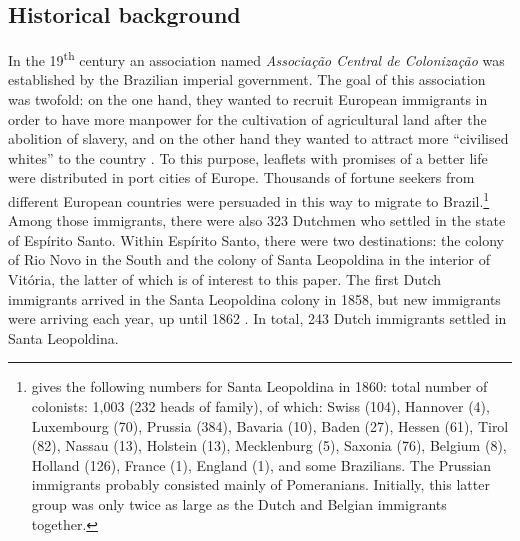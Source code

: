 \documentclass[output=paper,hidelinks,draftmode]{langscibook}
\begin{document}
\subsection{Historical background}

In the 19\textsuperscript{th} century an association named \textit{Associação Central de Colonização} was established by the Brazilian imperial government. The goal of this association was twofold: on the one hand, they wanted to recruit European immigrants in order to have more manpower for the cultivation of agricultural land after the abolition of slavery, and on the other hand they wanted to attract more ``civilised whites'' to the country \citep[11]{RoosEshuis2008}. To this purpose, leaflets with promises of a better life were distributed in port cities of Europe. Thousands of fortune seekers from different European countries were persuaded in this way to migrate to Brazil.\footnote{\citet{Tschudi2004} gives the following numbers for Santa Leopoldina in 1860: total number of colonists: 1,003 (232 heads of family), of which: Swiss (104), Hannover (4), Luxembourg (70), Prussia (384), Bavaria (10), Baden (27), Hessen (61), Tirol (82), Nassau (13), Holstein (13), Mecklenburg (5), Saxonia (76), Belgium (8), Holland (126), France (1), England (1), and some Brazilians. The Prussian immigrants probably consisted mainly of Pomeranians. Initially, this latter group was only twice as large as the Dutch and Belgian immigrants together.} Among those immigrants, there were also 323 Dutchmen who settled in the state of Espírito Santo. Within Espírito Santo, there were two destinations: the colony of Rio Novo in the South and the colony of Santa Leopoldina in the interior of Vitória, the latter of which is of interest to this paper. The first Dutch immigrants arrived in the Santa Leopoldina colony in 1858, but new immigrants were arriving each year, up until 1862 \citep[50, 121]{RoosEshuis2008}. In total, 243 Dutch immigrants settled in Santa Leopoldina.
\end{document}
